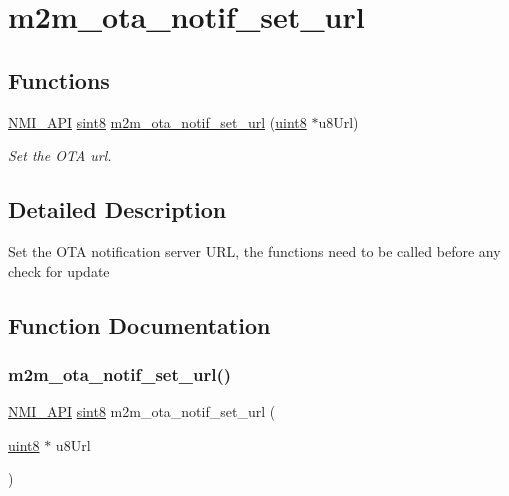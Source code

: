 \hypertarget{group__OtaNotifStFn}{}\section{m2m\+\_\+ota\+\_\+notif\+\_\+set\+\_\+url}
\label{group__OtaNotifStFn}
\subsection*{Functions}
\begin{DoxyCompactItemize}
\item 
\hyperlink{group__BSPDefine_gaecc0323d771e41ef81a76b5f12783e22}{N\+M\+I\+\_\+\+A\+PI} \hyperlink{group__DataT_gae35f10ffd0ac8dd2bc3e794da9bdfbc7}{sint8} \hyperlink{group__OtaNotifStFn_ga98ab9f03996e6bf1cb21ba7259bb0058}{m2m\+\_\+ota\+\_\+notif\+\_\+set\+\_\+url} (\hyperlink{group__DataT_ga4df709a77647e870bbf1d955b8edc9a6}{uint8} $\ast$u8\+Url)
\begin{DoxyCompactList}\small\item\em Set the O\+TA url. \end{DoxyCompactList}\end{DoxyCompactItemize}


\subsection{Detailed Description}
Set the O\+TA notification server U\+RL, the functions need to be called before any check for update 

\subsection{Function Documentation}
\mbox{\label{group__OtaNotifStFn_ga98ab9f03996e6bf1cb21ba7259bb0058}} 
\subsubsection{\texorpdfstring{m2m\+\_\+ota\+\_\+notif\+\_\+set\+\_\+url()}{m2m\_ota\_notif\_set\_url()}}
{\footnotesize\ttfamily \hyperlink{group__BSPDefine_gaecc0323d771e41ef81a76b5f12783e22}{N\+M\+I\+\_\+\+A\+PI} \hyperlink{group__DataT_gae35f10ffd0ac8dd2bc3e794da9bdfbc7}{sint8} m2m\+\_\+ota\+\_\+notif\+\_\+set\+\_\+url (\begin{DoxyParamCaption}\item[{\hyperlink{group__DataT_ga4df709a77647e870bbf1d955b8edc9a6}{uint8} $\ast$}]{u8\+Url }\end{DoxyParamCaption})}



